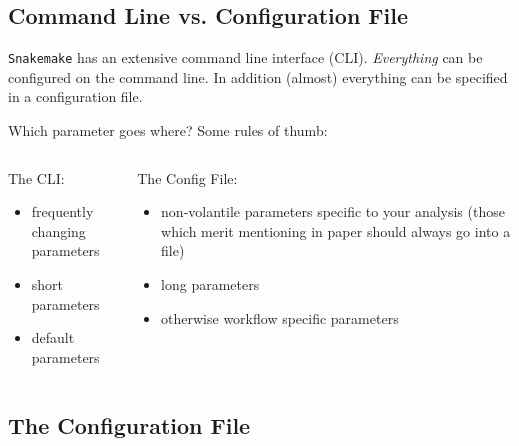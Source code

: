 \subsection{Command Line vs. Configuration File}

\begin{frame}
  \begin{docs}
  	\texttt{Snakemake} has an extensive command line interface (CLI). \emph{Everything} can be configured on the command line. In addition (almost) everything can be specified in a configuration file.
  \end{docs}
  \pause
  \begin{exampleblock}{Which parameter goes where? Some rules of thumb:}
    \begin{columns}[t]
      \begin{column}{0.5\textwidth}
        The CLI:
        \begin{itemize}
         \item frequently changing parameters
         \item short parameters
         \item default parameters
        \end{itemize}
      \end{column}
      \begin{column}{0.5\textwidth}
        The Config File:
        \begin{itemize}
         \item non-volantile parameters specific to your analysis (those which merit mentioning in paper should always go into a file)
         \item long parameters
         \item otherwise workflow specific parameters
        \end{itemize}
      \end{column}
    \end{columns}
  \end{exampleblock}
\end{frame}

\subsection{The Configuration File}

